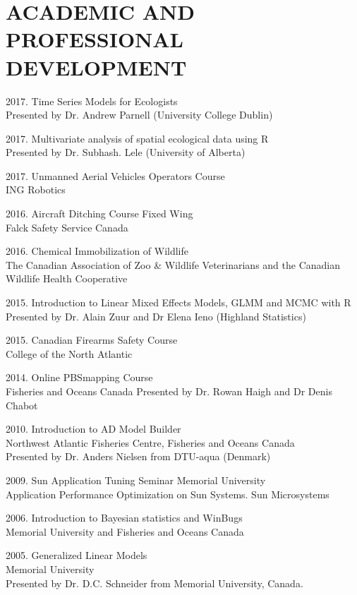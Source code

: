 \documentclass{res}
\begin{document}
\begin{resume}
\begin{hangparas}{.4in}{1}
\end{hangparas}
\section{ACADEMIC AND PROFESSIONAL DEVELOPMENT}
\vspace{0.2in}
\begin{hangparas}{.4in}{1}
2017. Time Series Models for Ecologists\\ 
Presented by Dr. Andrew Parnell (University College Dublin)

2017. Multivariate analysis of spatial ecological data using R\\
Presented by Dr. Subhash. Lele (University of Alberta)

2017. Unmanned Aerial Vehicles Operators Course\\ 
ING Robotics

2016. Aircraft Ditching Course Fixed Wing \\
Falck Safety Service Canada

2016. Chemical Immobilization of Wildlife\\
The Canadian Association of Zoo \& Wildlife Veterinarians and the Canadian Wildlife Health Cooperative

2015. Introduction to Linear Mixed Effects Models, GLMM and MCMC with R\\
Presented by Dr. Alain Zuur and Dr Elena Ieno (Highland Statistics)

2015. Canadian Firearms Safety Course\\
College of the North Atlantic

2014. Online PBSmapping  Course\\
Fisheries and Oceans Canada 
Presented by Dr. Rowan Haigh and Dr Denis Chabot

2010. Introduction to AD Model Builder\\
Northwest Atlantic Fisheries Centre, Fisheries and Oceans Canada \\
Presented by Dr. Anders Nielsen from DTU-aqua (Denmark)

2009. Sun Application Tuning Seminar
Memorial University\\
Application Performance Optimization on Sun Systems. Sun Microsystems

2006. Introduction to Bayesian statistics and WinBugs\\
Memorial University and Fisheries and Oceans Canada 

2005. Generalized Linear Models\\
Memorial University\\
Presented by Dr. D.C. Schneider from Memorial University, Canada.


\end{hangparas}
\end{resume}
\end{document}
